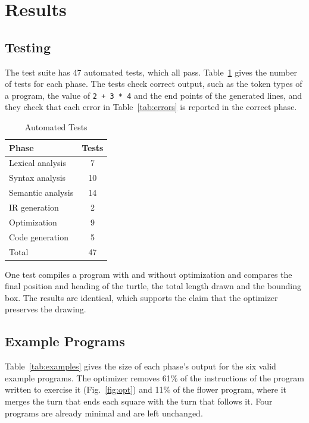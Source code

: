 \documentclass[conference]{IEEEtran}
\newcommand{\kw}[1]{\texttt{#1}}
\begin{document}
\section{Results}\label{sec:results}

\subsection{Testing}
The test suite has 47 automated tests, which all pass. Table~\ref{tab:tests} gives the number of tests for each phase. The tests check correct output, such as the token types of a program, the value of \kw{2 + 3 * 4} and the end points of the generated lines, and they check that each error in Table~\ref{tab:errors} is reported in the correct phase.

\begin{table}[htbp]
\caption{Automated Tests}
\label{tab:tests}
\centering
\footnotesize
\begin{tabular}{@{}lc@{}}
\toprule
Phase & Tests\\
\midrule
Lexical analysis & 7\\
Syntax analysis & 10\\
Semantic analysis & 14\\
IR generation & 2\\
Optimization & 9\\
Code generation & 5\\
\midrule
Total & 47\\
\bottomrule
\end{tabular}
\end{table}

One test compiles a program with and without optimization and compares the final position and heading of the turtle, the total length drawn and the bounding box. The results are identical, which supports the claim that the optimizer preserves the drawing.

\subsection{Example Programs}
Table~\ref{tab:examples} gives the size of each phase's output for the six valid example programs. The optimizer removes 61\% of the instructions of the program written to exercise it (Fig.~\ref{fig:opt}) and 11\% of the flower program, where it merges the turn that ends each square with the turn that follows it. Four programs are already minimal and are left unchanged.
\end{document}

